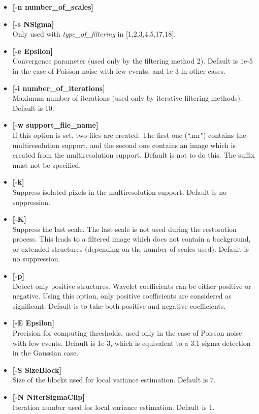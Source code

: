 \begin{itemize}
\begin{itemize}
\item {\bf [-n number\_of\_scales]} 
\item {\bf [-s NSigma]} \\
Only used with {\em type\_of\_filtering} in [1,2,3,4,5,17,18].
\item {\bf [-e Epsilon]} \\
Convergence parameter (used only by the filtering method 2). Default is 
1e-5 in the case of Poisson noise with few events, 
and 1e-3 in other cases.
\item {\bf [-i number\_of\_iterations]} \\
Maximum number of iterations (used only by iterative filtering 
methods). Default is 10. 
\item {\bf [-w support\_file\_name]} \\
If this option is set, two files are created. The first one (``.mr") contains
the multiresolution support, and the second one contains 
 an image which is created from the  multiresolution support.
 Default is not to do this. The suffix must not be specified.
\item {\bf [-k]} \\
Suppress isolated pixels in the multiresolution support. Default is no
suppression.
\item {\bf [-K]} \\
Suppress the last scale. The last scale is not used during the restoration
process. This leads to a 
filtered image which does not contain a background,
or extended structures (depending on the number of scales used). 
Default is no suppression.
 \item {\bf [-p]} \\
Detect only positive structures. Wavelet coefficients can be either positive 
or negative. Using this option, only positive coefficients are considered
as significant. Default is to take both positive and negative coefficients.
\item {\bf [-E Epsilon]} \\
Precision for computing thresholds, used only  in the case of Poisson noise
 with few events. Default is 1e-3, which is equivalent to a $3.1$ sigma 
detection in the Gaussian case.
\item {\bf [-S SizeBlock]} \\
Size of the  blocks used for local variance estimation. Default is 7.
\item {\bf [-N NiterSigmaClip]} \\
Iteration number used for local variance estimation. Default is 1.

\end{itemize}
\end{itemize}
